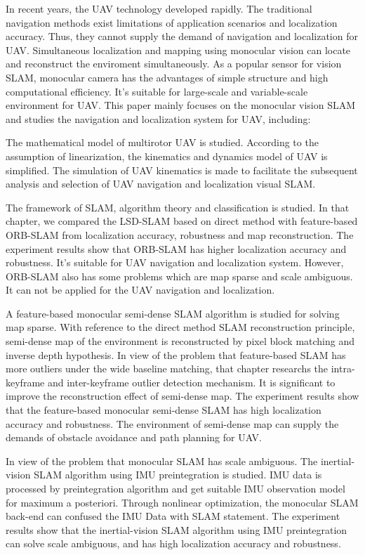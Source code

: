 \begin{englishabstract}
In recent years, the UAV technology developed rapidly. The traditional navigation methods exist limitations of application scenarios and localization accuracy. Thus, they cannot supply the demand of navigation and localization for UAV. Simultaneous localization and mapping using monocular vision can locate and reconstruct the enviroment simultaneously.  
As a popular sensor for vision SLAM, monocular camera has the advantages of simple structure and high computational efficiency. It's suitable for large-scale and variable-scale environment for UAV. This paper mainly focuses on the monocular vision SLAM and studies the navigation and localization system for UAV, including:

The mathematical model of multirotor UAV is studied. According to the assumption of linearization, the kinematics and dynamics model of UAV is simplified. The simulation of UAV  kinematics is made to facilitate the subsequent analysis and selection of UAV navigation and localization visual SLAM.

The framework of SLAM, algorithm theory and classification is studied. In that chapter, we compared the LSD-SLAM based on direct method with feature-based ORB-SLAM from localization accuracy, robustness and map reconstruction. The experiment results show that ORB-SLAM has higher localization accuracy and robustness. It's suitable for UAV navigation and localization system. However, ORB-SLAM also has some problems which are map sparse and scale ambiguous. It can not be applied for the UAV navigation and localization.

A feature-based monocular semi-dense SLAM algorithm is studied for solving map sparse. With reference to the direct method SLAM reconstruction principle, semi-dense map of the environment is reconstructed by pixel block matching and inverse depth hypothesis. In view of the problem that feature-based SLAM has more outliers under the wide baseline matching, that chapter researchs the intra-keyframe and inter-keyframe outlier detection mechanism. It is significant to improve the reconstruction effect of semi-dense map. The 
experiment results show that the feature-based monocular semi-dense SLAM has high localization accuracy and robustness. The environment of semi-dense map can supply the demands of obstacle avoidance and path planning for UAV.

In view of the problem that monocular SLAM has scale ambiguous. The inertial-vision SLAM algorithm using IMU preintegration is studied. IMU data is processed by preintegration algorithm and get suitable IMU observation model for maximum a posteriori.  Through nonlinear optimization, the monocular SLAM back-end can confused the IMU Data with SLAM statement. The experiment results show that the inertial-vision SLAM algorithm using IMU preintegration can solve scale ambiguous, and has high localization accuracy and robustness. 
  

\end{englishabstract}
